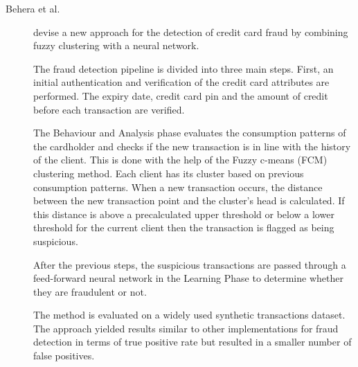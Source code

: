 \begin{description}
    \item[Behera et al.]\cite{Behera.Panigrahi_CreditCardFraud_2015} devise a new approach for the detection of credit card fraud by combining fuzzy clustering with a neural network. 
    
    The fraud detection pipeline is divided into three main steps. First, an initial authentication and verification of the credit card attributes are performed. The expiry date, credit card pin and the amount of credit before each transaction are verified. 
    
    The Behaviour and Analysis phase evaluates the consumption patterns of the cardholder and checks if the new transaction is in line with the history of the client. This is done with the help of the Fuzzy c-means (FCM) clustering method. Each client has its cluster based on previous consumption patterns. When a new transaction occurs, the distance between the new transaction point and the cluster's head is calculated. If this distance is above a precalculated upper threshold or below a lower threshold for the current client then the transaction is flagged as being suspicious.

    After the previous steps, the suspicious transactions are passed through a feed-forward neural network in the Learning Phase to determine whether they are fraudulent or not.

    The method is evaluated on a widely used synthetic transactions dataset. The approach yielded results similar to other implementations for fraud detection in terms of true positive rate but resulted in a smaller number of false positives.
\end{description}

